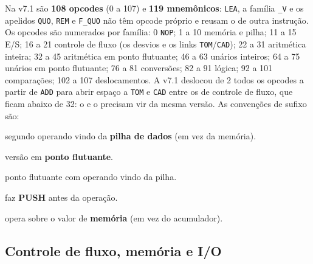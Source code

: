 Na v7.1 são \textbf{108 opcodes} (0 a 107) e \textbf{119 mnemônicos}: \lstinline|LEA|, a
família \lstinline|_V| e os apelidos \lstinline|QUO|, \lstinline|REM| e \lstinline|F_QUO| não
têm opcode próprio e reusam o de outra instrução. Os opcodes são numerados por família: 0
\lstinline|NOP|; 1 a 10 memória e pilha; 11 a 15 E/S; 16 a 21 controle de fluxo (os desvios
e os links \lstinline|TOM|/\lstinline|CAD|); 22 a 31 aritmética inteira; 32 a 45 aritmética
em ponto flutuante; 46 a 63 unários inteiros; 64 a 75 unários em ponto flutuante; 76 a 81
conversões; 82 a 91 lógica; 92 a 101 comparações; 102 a 107 deslocamentos. A v7.1 deslocou
de 2 todos os opcodes a partir de \lstinline|ADD| para abrir espaço a \lstinline|TOM| e
\lstinline|CAD| entre os de controle de fluxo, que ficam abaixo de 32: o  e o
 precisam vir da mesma versão. As convenções de sufixo são:

\begin{description}[leftmargin=2.6em]
  \item[\texttt{S\_}] segundo operando vindo da \textbf{pilha de dados} (em vez da memória).
  \item[\texttt{F\_}] versão em \textbf{ponto flutuante}.
  \item[\texttt{SF\_}] ponto flutuante com operando vindo da pilha.
  \item[\texttt{P\_}] faz \textbf{PUSH} antes da operação.
  \item[\texttt{\_M}] opera sobre o valor de \textbf{memória} (em vez do acumulador).
\end{description}

\subsection{Controle de fluxo, memória e I/O}
\label{sec:arq-isa-ctrl}

